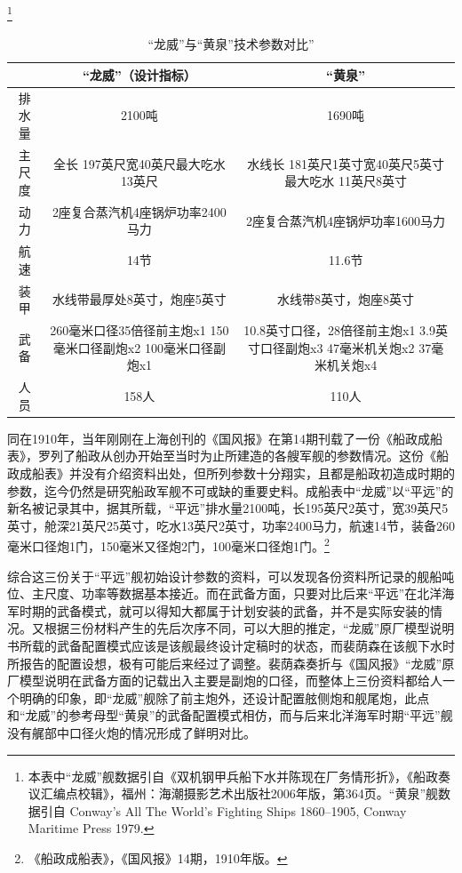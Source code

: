 \documentclass[12pt,UTF8]{ctexbook}
\begin{document}
\footnote{本表中“龙威”舰数据引自《双机钢甲兵船下水并陈现在厂务情形折》，《船政奏议汇编点校辑》，福州：海潮摄影艺术出版社2006年版，第364页。“黄泉”舰数据引自 Conway's All The World's Fighting Ships 1860--1905, Conway Maritime Press 1979.}

\begin{table}[]
	\centering
	\label{tab:标签}
	\caption{“龙威”与“黄泉”技术参数对比”}
	\begin{tabular}{|c|c|c|}
		\hline
		& “龙威”（设计指标） & “黄泉” \\
		\hline
		排水量 & 2100吨 & 1690吨 \\
		\hline
		主尺度 & 全长 197英尺宽40英尺最大吃水13英尺 & 水线长 181英尺1英寸宽40英尺5英寸最大吃水 11英尺8英寸 \\
		\hline
		动力 & 2座复合蒸汽机4座锅炉功率2400马力 & 2座复合蒸汽机4座锅炉功率1600马力 \\
		\hline
		航速 & 14节 & 11.6节 \\
		\hline
		装甲 & 水线带最厚处8英寸，炮座5英寸 & 水线带8英寸，炮座8英寸 \\
		\hline
		武备 & 260毫米口径35倍径前主炮x1 150毫米口径副炮x2 100毫米口径副炮x1 & 10.8英寸口径，28倍径前主炮x1 3.9英寸口径副炮x3 47毫米机关炮x2 37毫米机关炮x4 \\
		\hline
		人员 & 158人 & 110人 \\
		\hline
	\end{tabular}
\end{table}

同在1910年，当年刚刚在上海创刊的《国风报》在第14期刊载了一份《船政成船表》，罗列了船政从创办开始至当时为止所建造的各艘军舰的参数情况。这份《船政成船表》并没有介绍资料出处，但所列参数十分翔实，且都是船政初造成时期的参数，迄今仍然是研究船政军舰不可或缺的重要史料。成船表中“龙威”以“平远”的新名被记录其中，据其所载，“平远”排水量2100吨，长195英尺2英寸，宽39英尺5英寸，舱深21英尺25英寸，吃水13英尺2英寸，功率2400马力，航速14节，装备260毫米口径炮1门，150毫米又径炮2门，100毫米口径炮1门。\footnote{《船政成船表》，《国风报》14期，1910年版。}

综合这三份关于“平远”舰初始设计参数的资料，可以发现各份资料所记录的舰船吨位、主尺度、功率等数据基本接近。而在武备方面，只要对比后来“平远”在北洋海军时期的武备模式，就可以得知大都属于计划安装的武备，并不是实际安装的情况。又根据三份材料产生的先后次序不同，可以大胆的推定，“龙威”原厂模型说明书所载的武备配置模式应该是该舰最终设计定稿时的状态，而裴荫森在该舰下水时所报告的配置设想，极有可能后来经过了调整。裴荫森奏折与《国风报》“龙威”原厂模型说明在武备方面的记载出入主要是副炮的口径，而整体上三份资料都给人一个明确的印象，即“龙威”舰除了前主炮外，还设计配置舷侧炮和舰尾炮，此点和“龙威”的参考母型“黄泉”的武备配置模式相仿，而与后来北洋海军时期“平远”舰没有艉部中口径火炮的情况形成了鲜明对比。
\end{document}
